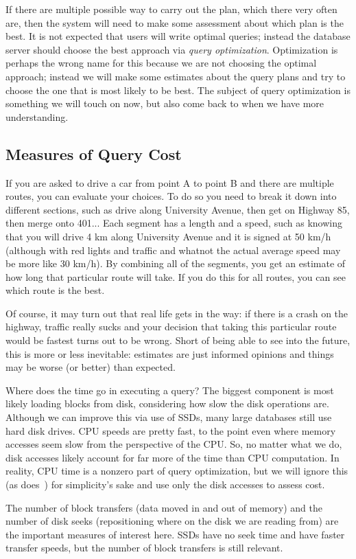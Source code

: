 If there are multiple possible way to carry out the plan, which there very often are, then the system will need to make some assessment about which plan is the best. It is not expected that users will write optimal queries; instead the database server should choose the best approach via \textit{query optimization}. Optimization is perhaps the wrong name for this because we are not choosing the optimal approach; instead we will make some estimates about the query plans and try to choose the one that is most likely to be best. The subject of query optimization is something we will touch on now, but also come back to when we have more understanding.

\subsection*{Measures of Query Cost}

If you are asked to drive a car from point A to point B and there are multiple routes, you can evaluate your choices. To do so you need to break it down into different sections, such as drive along University Avenue, then get on Highway 85, then merge onto 401... Each segment has a length and a speed, such as knowing that you will drive 4 km along University Avenue and it is signed at 50 km/h (although with red lights and traffic and whatnot the actual average speed may be more like 30 km/h). By combining all of the segments, you get an estimate of how long that particular route will take. If you do this for all routes, you can see which route is the best. 

Of course, it may turn out that real life gets in the way: if there is a crash on the highway, traffic really sucks and your decision that taking this particular route would be fastest turns out to be wrong. Short of being able to see into the future, this is more or less inevitable: estimates are just informed opinions and things may be worse (or better) than expected. 

Where does the time go in executing a query? The biggest component is most likely loading blocks from disk, considering how slow the disk operations are. Although we can improve this via use of SSDs, many large databases still use hard disk drives. CPU speeds are pretty fast, to the point even where memory accesses seem slow from the perspective of the CPU. So, no matter what we do, disk accesses likely account for far more of the time than CPU computation. In reality, CPU time is a nonzero part of query optimization, but we will ignore this (as does~\cite{dsc}) for simplicity's sake and use only the disk accesses to assess cost.

The number of block transfers (data moved in and out of memory) and the number of disk seeks (repositioning where on the disk we are reading from) are the important measures of interest here. SSDs have no seek time and have faster transfer speeds, but the number of block transfers is still relevant. 





